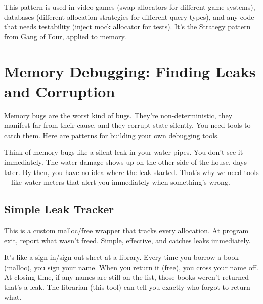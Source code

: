 \begin{tipbox}
This pattern is used in video games (swap allocators for different game systems), databases (different allocation strategies for different query types), and any code that needs testability (inject mock allocator for tests). It's the Strategy pattern from Gang of Four, applied to memory.
\end{tipbox}

\section{Memory Debugging: Finding Leaks and Corruption}

Memory bugs are the worst kind of bugs. They're non-deterministic, they manifest far from their cause, and they corrupt state silently. You need tools to catch them. Here are patterns for building your own debugging tools.

Think of memory bugs like a silent leak in your water pipes. You don't see it immediately. The water damage shows up on the other side of the house, days later. By then, you have no idea where the leak started. That's why we need tools---like water meters that alert you immediately when something's wrong.

\subsection{Simple Leak Tracker}

This is a custom malloc/free wrapper that tracks every allocation. At program exit, report what wasn't freed. Simple, effective, and catches leaks immediately.

It's like a sign-in/sign-out sheet at a library. Every time you borrow a book (malloc), you sign your name. When you return it (free), you cross your name off. At closing time, if any names are still on the list, those books weren't returned---that's a leak. The librarian (this tool) can tell you exactly who forgot to return what.

